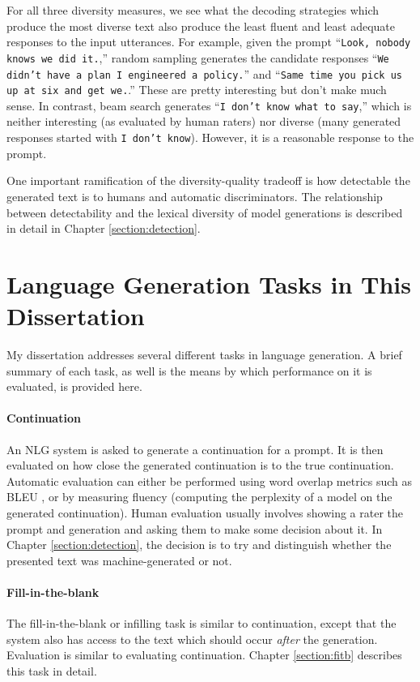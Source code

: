 \begin{itemize}
For all three diversity measures, we see what the decoding strategies which produce the most diverse text also produce the least fluent and least adequate responses to the input utterances.
For example, given the prompt ``\texttt{Look, nobody knows we did it.},'' random sampling generates the candidate responses ``\texttt{We didn’t have a plan I engineered a policy.}'' and ``\texttt{Same time you pick us up at six and get we.}.''
These are pretty interesting but don't make much sense.
In contrast, beam search generates ``\texttt{I don’t know what to say},'' which is neither interesting (as evaluated by human raters) nor diverse (many generated responses started with \texttt{I don't know}).
However, it is a reasonable response to the prompt.

One important ramification of the diversity-quality tradeoff is how detectable the generated text is to humans and automatic discriminators.
The relationship between detectability and the lexical diversity of model generations is described in detail in Chapter \ref{section:detection}.

\section{Language Generation Tasks in This Dissertation}
My dissertation addresses several different tasks in language generation.
A brief summary of each task, as well is the means by which performance on it is evaluated, is provided here.

\paragraph{Continuation}
An NLG system is asked to generate a continuation for a prompt. It is then evaluated on how close the generated continuation is to the true continuation. Automatic evaluation can either be performed using word overlap metrics such as BLEU \citep{papineni2001bleu}, or by measuring fluency (computing the perplexity of a model on the generated continuation).
Human evaluation usually involves showing a rater the prompt and generation and asking them to make some decision about it.
In Chapter \ref{section:detection}, the decision is to try and distinguish whether the presented text was machine-generated or not.

\paragraph{Fill-in-the-blank}
The fill-in-the-blank or infilling task is similar to continuation, except that the system also has access to the text which should occur \textit{after} the generation.
Evaluation is similar to evaluating continuation.
Chapter \ref{section:fitb} describes this task in detail.


\end{itemize}

